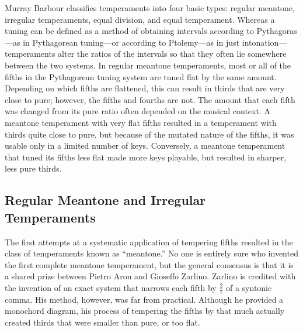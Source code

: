 Murray Barbour classifies temperaments into four basic types: regular meantone, irregular
temperaments, equal division, and equal temperament. Whereas a tuning can be defined as a
method of obtaining intervals according to Pythagoras---as in Pythagorean tuning---or
according to Ptolemy---as in just intonation---temperaments alter the ratios of the
intervals so that they often lie somewhere between the two systems. In regular meantone
temperaments, most or all of the fifths in the Pythagorean tuning system are tuned flat by
the same amount.  Depending on which fifths are flattened, this can
result in thirds that are very close to pure; however, the fifths and fourths are not.  
The amount that each fifth was changed from its pure ratio often
depended on the musical context.  A meantone temperament with very flat fifths
resulted in a temperament with thirds quite close to pure, but because of the mutated
nature of the fifths, it was usable only in a limited number of keys.  Conversely, a
meantone temperament that tuned its fifths less flat made more keys playable, but resulted
in sharper, less pure thirds.

\subsection{Regular Meantone and Irregular Temperaments}

The first attempts at a systematic application of tempering fifths resulted in the class
of temperaments known as ``meantone.''  No one is entirely sure who invented the
first complete meantone temperament, but the general consensus is that it is a shared
prize between Pietro Aron and Gioseffo Zarlino. Zarlino is credited with the invention of an exact
system that narrows each fifth by $\frac{2}{7}$ of a syntonic comma.  His method, however,
was far from practical.  Although he provided a monochord diagram, his process of
tempering the fifths by that much actually created thirds that were smaller than pure, or
too flat.

